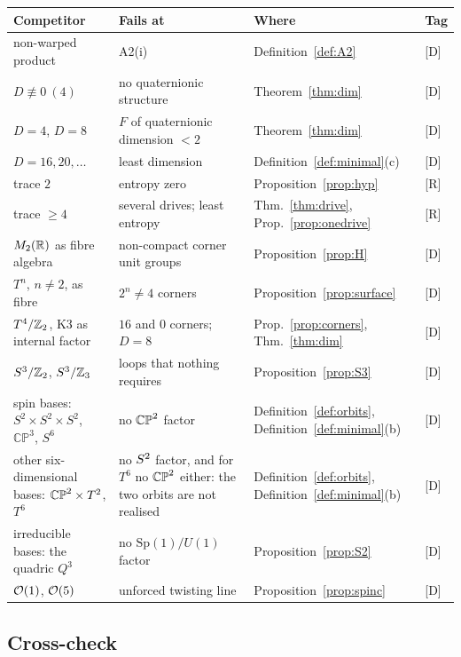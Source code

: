 \documentclass[11pt,a4paper]{article}
\theoremstyle{plain}
\theoremstyle{definition}
\theoremstyle{remark}
\newcommand{\rigR}{[\textup{R}]}
\newcommand{\rigD}{[\textup{D}]}
\begin{document}
\begin{center}
\small
\begin{tabular}{@{}p{}p{}p{}@{\hspace{4pt}}l@{}}
\toprule
Competitor & Fails at & Where & Tag\\
\midrule
non-warped product & A2(i) & Definition~\ref{def:A2} & \rigD\\
$D\not\equiv0\ (4)$ & no quaternionic structure & Theorem~\ref{thm:dim} & \rigD\\
$D=4$, $D=8$ & $F$ of quaternionic dimension $<2$ & Theorem~\ref{thm:dim} & \rigD\\
$D=16,20,\dots$ & least dimension & Definition~\ref{def:minimal}(c) & \rigD\\
trace $2$ & entropy zero & Proposition~\ref{prop:hyp} & \rigR\\
trace $\geq4$ & several drives; least entropy & Thm.~\ref{thm:drive}, Prop.~\ref{prop:onedrive} & \rigR\\
$M_{2}(\mathbb{R})$ as fibre algebra & non-compact corner unit groups & Proposition~\ref{prop:H} & \rigD\\
$T^{n}$, $n\neq2$, as fibre & $2^{n}\neq4$ corners & Proposition~\ref{prop:surface} & \rigD\\
$T^{4}/\mathbb{Z}_{2}$, K3 as internal factor & $16$ and $0$ corners; $D=8$ & Prop.~\ref{prop:corners}, Thm.~\ref{thm:dim} & \rigD\\
$S^{3}/\mathbb{Z}_{2}$, $S^{3}/\mathbb{Z}_{3}$ & loops that nothing requires & Proposition~\ref{prop:S3} & \rigD\\
spin bases: $S^{2}\times S^{2}\times S^{2}$, $\mathbb{CP}^{3}$, $S^{6}$ & no $\mathbb{CP}^2$ factor & Definition~\ref{def:orbits}, Definition~\ref{def:minimal}(b) & \rigD\\
other six-dimensional bases: $\mathbb{CP}^2\times T^{2}$, $T^{6}$ & no $S^2$ factor, and for $T^{6}$ no $\mathbb{CP}^2$ either: the two orbits are not realised & Definition~\ref{def:orbits}, Definition~\ref{def:minimal}(b) & \rigD\\
irreducible bases: the quadric $Q^{3}$ & no $\mathrm{Sp}(1)/U(1)$ factor & Proposition~\ref{prop:S2} & \rigD\\
$\mathcal{O}(1)$, $\mathcal{O}(5)$ & unforced twisting line & Proposition~\ref{prop:spinc} & \rigD\\
\bottomrule
\end{tabular}
\end{center}

\subsection{Cross-check}
\end{document}
